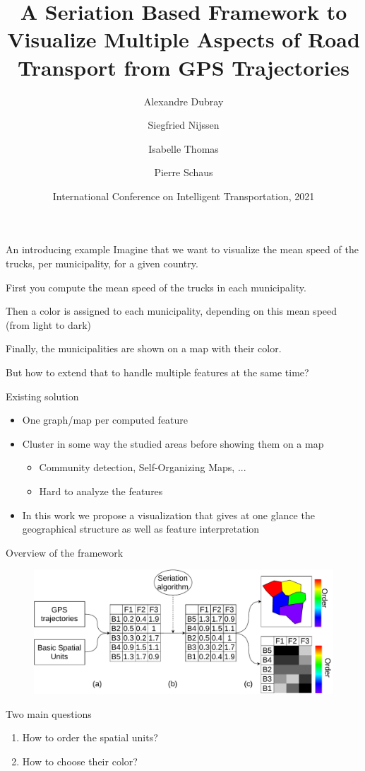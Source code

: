 \documentclass[10pt]{beamer}
\title{A Seriation Based Framework to Visualize Multiple Aspects of Road Transport from GPS Trajectories}
\date{International Conference on Intelligent Transportation, 2021}
\author{Alexandre Dubray \and Siegfried Nijssen \and Isabelle Thomas \and Pierre Schaus}
\institute{}
\begin{document}
\maketitle

\begin{frame}{An introducing example}
Imagine that we want to visualize the mean speed of the trucks, per municipality, for a given country.
\pause

First you compute the mean speed of the trucks in each municipality.
\pause

Then a color is assigned to each municipality, depending on this mean speed (from light to dark)
\pause

Finally, the municipalities are shown on a map with their color.
\pause

But how to extend that to handle multiple features at the same time?
\end{frame}

\begin{frame}{Existing solution}
    \begin{itemize}
        \item One graph/map per computed feature
        \item Cluster in some way the studied areas before showing them on a map
            \begin{itemize}
                \item Community detection, Self-Organizing Maps, ...
                \item Hard to analyze the features
            \end{itemize}
        \item In this work we propose a visualization that gives at one glance the geographical structure as well as feature interpretation
    \end{itemize}
\end{frame}

\begin{frame}{Overview of the framework}
\begin{figure}
    \centering
    \includegraphics[scale=0.45]{process.pdf}
\end{figure}

\pause

Two main questions
\begin{enumerate}
    \item How to order the spatial units?
    \item How to choose their color?
\end{enumerate}
\end{frame}
\end{document}
